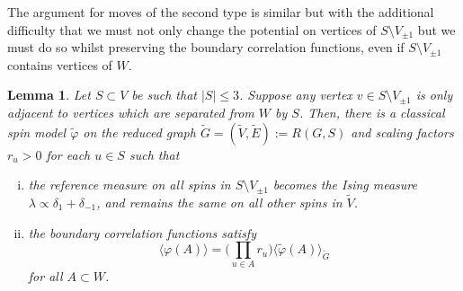 \documentclass{article}
\newtheorem{lemma}[theorem]{Lemma}
\numberwithin{equation}{section}
\theoremstyle{definition}
\theoremstyle{definition}
\theoremstyle{remark}
\newcommand\vp{\varphi}
\renewcommand{\l}{\lambda}
\newcommand{\Vis}{V_{\mathrm{Ising}}}
\renewcommand{\Vis}{V_{\pm 1}}
\begin{document}
The argument for moves of the second type is similar but with the additional difficulty that we must not only change the potential on vertices of $S \setminus \Vis$ but we must do so whilst preserving the boundary correlation functions, even if $S \setminus \Vis$ contains vertices of $W$.
\begin{lemma}\label{lemma:secondmove}
	Let $S \subset V$ be such that $|S| \leq 3$. Suppose any vertex $v \in S \setminus \Vis$ is only adjacent to vertices which are separated from $W$ by $S$. 
	Then, there is a classical spin model $ \widetilde{\vp}$ on the reduced graph $ \widetilde{G} = ( \widetilde{V}, \widetilde{E}) := R(G,S)$ and scaling factors $r_u > 0$ for each $u \in S$ such that
	\begin{enumerate}[(i)]
		\item the reference measure on all spins in $S \setminus \Vis$ becomes the Ising measure $\l\propto \delta_{1} + \delta_{-1}$,
			and remains the same on all other spins in $ \widetilde{V}$.
		\item  the boundary correlation functions satisfy
		\begin{equation}\label{eq:goalcorr2}
			\langle \vp({A}) \rangle = \Big( \prod_{u \in A}  r_u \Big) \langle \widetilde{\vp}(A) \rangle_{ \widetilde{G}}
            \end{equation}
            for all $A \subset W$. 
	\end{enumerate}
\end{lemma}
\end{document}
